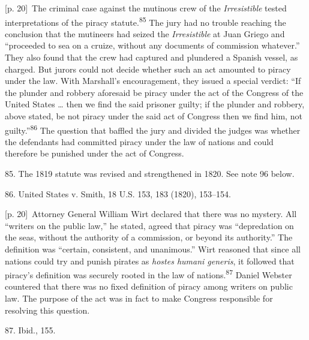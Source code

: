 \documentclass[10pt,a4paper]{article}
\begin{document}
{\scriptsize\color{gray} [p. 20]}\ The criminal case against the mutinous crew of the \textit{Irresistible} tested interpretations of the piracy statute.\nobreak\textsuperscript{85} The jury had no trouble reaching the conclusion that the mutineers had seized the \textit{Irresistible} at Juan Griego and “proceeded to sea on a cruize, without any documents of commission whatever.” They also found that the crew had captured and plundered a Spanish vessel, as charged. But jurors could not decide whether such an act amounted to piracy under the law. With Marshall’s encouragement, they issued a special verdict: “If the plunder and robbery aforesaid be piracy under the act of the Congress of the United States … then we find the said prisoner guilty; if the plunder and robbery, above stated, be not piracy under the said act of Congress then we find him, not guilty.”\nobreak\textsuperscript{86} The question that baffled the jury and divided the judges was whether the defendants had committed piracy under the law of nations and could therefore be punished under the act of Congress.\par{\small 85. The 1819 statute was revised and strengthened in 1820. See note 96 below.\par}{\small 86. United States v. Smith, 18 U.S. 153, 183 (1820), 153–154.\par}
{\scriptsize\color{gray} [p. 20]}\ Attorney General William Wirt declared that there was no mystery. All “writers on the public law,” he stated, agreed that piracy was “depredation on the seas, without the authority of a commission, or beyond its authority.” The definition was “certain, consistent, and unanimous.” Wirt reasoned that since all nations could try and punish pirates as \textit{hostes humani generis}, it followed that piracy’s definition was securely rooted in the law of nations.\nobreak\textsuperscript{87} Daniel Webster countered that there was no fixed definition of piracy among writers on public law. The purpose of the act was in fact to make Congress responsible for resolving this question.\par{\small 87. Ibid., 155.\par}
\end{document}
